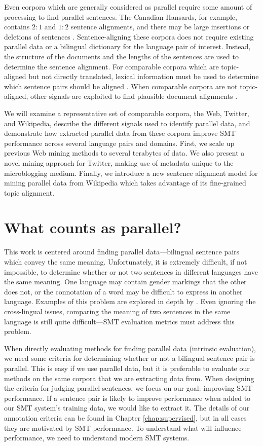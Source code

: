 Even corpora which are generally considered as parallel require some amount of
processing to find parallel sentences. The Canadian Hansards, for example,
contains $2:1$ and $1:2$ sentence alignments, and
there may be large insertions or deletions of sentences \citep{Gale93,Chen93}.
Sentence-aligning these corpora does not require existing parallel data or a
bilingual dictionary for the language pair of interest. Instead, the structure
of the documents and the lengths of the sentences are used to determine the
sentence alignment. For comparable corpora which are topic-aligned but not
directly translated, lexical information must be used to determine which
sentence pairs should be aligned \citep{Munteanu05}. When comparable corpora are
not topic-aligned, other signals are exploited to find plausible document
alignments \citep{Resnik03}.

We will examine a representative set of comparable corpora, the Web, Twitter,
and Wikipedia, describe the different signals used to identify parallel data,
and demonstrate how extracted parallel data from these corpora improve SMT
performance across several language pairs and domains. First, we scale up
previous Web mining methods \citep{Resnik03} to several terabytes of data. We
also present a novel mining approach for Twitter, making use of metadata unique
to the microblogging medium. Finally, we introduce a new sentence alignment
model for mining parallel data from Wikipedia which takes advantage of its
fine-grained topic alignment.

\section{What counts as parallel?}
This work is centered around finding parallel data---bilingual sentence pairs
which convey the same meaning. Unfortunately, it is extremely difficult, if not
impossible, to determine whether or not two sentences in different languages
have the same meaning. One language may contain gender markings that the other
does not, or the connotation of a word may be difficult to express in another
language. Examples of this problem are explored in depth by \citet{Kay97}. 
Even ignoring the cross-lingual issues, comparing the meaning of two sentences
in the same language is still quite difficult---SMT evaluation metrics
\citep{Papineni02,Banerjee05,Snover06} must address this problem.

When directly evaluating methods for finding parallel data (intrinsic
evaluation), we need some criteria for determining whether or not a bilingual
sentence pair is parallel. This is easy if we use parallel data, but
it is preferable to evaluate our methods on the same corpora that we are
extracting data from. When designing the criteria for judging parallel
sentences, we focus on our goal: improving SMT performance. If a sentence pair
is likely to improve performance when added to our SMT system's training data,
we would like to extract it. The details of our annotation criteria can be found
in Chapter \ref{chap:supervised}, but in all cases they are motivated by SMT
performance. To understand what will influence performance, we need to
understand modern SMT systems.

